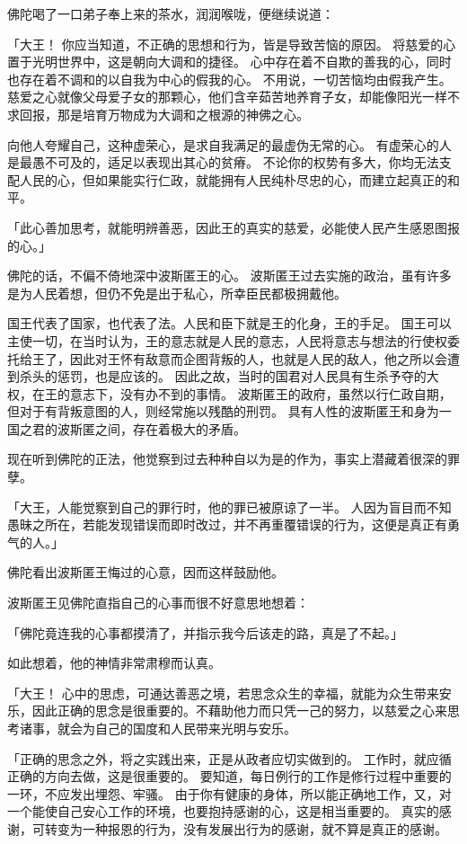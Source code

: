 \documentclass[twoside,openany]{book}
\begin{document}
佛陀喝了一口弟子奉上来的茶水，润润喉咙，便继续说道：

「大王！
你应当知道，不正确的思想和行为，皆是导致苦恼的原因。
将慈爱的心置于光明世界中，这是朝向大调和的捷径。
心中存在着不自欺的善我的心，同时也存在着不调和的以自我为中心的假我的心。
不用说，一切苦恼均由假我产生。
慈爱之心就像父母爱子女的那颗心，他们含辛茹苦地养育子女，却能像阳光一样不求回报，那是培育万物成为大调和之根源的神佛之心。

向他人夸耀自己，这种虚荣心，是求自我满足的最虚伪无常的心。
有虚荣心的人是最愚不可及的，适足以表现出其心的贫瘠。
不论你的权势有多大，你均无法支配人民的心，但如果能实行仁政，就能拥有人民纯朴尽忠的心，而建立起真正的和平。

「此心善加思考，就能明辨善恶，因此王的真实的慈爱，必能使人民产生感恩图报的心。」

佛陀的话，不偏不倚地深中波斯匿王的心。
波斯匿王过去实施的政治，虽有许多是为人民着想，但仍不免是出于私心，所幸臣民都极拥戴他。

国王代表了国家，也代表了法。人民和臣下就是王的化身，王的手足。
国王可以主使一切，在当时认为，王的意志就是人民的意志，人民将意志与想法的行使权委托给王了，因此对王怀有敌意而企图背叛的人，也就是人民的敌人，他之所以会遭到杀头的惩罚，也是应该的。
因此之故，当时的国君对人民具有生杀予夺的大权，在王的意志下，没有办不到的事情。
波斯匿王的政府，虽然以行仁政自期，但对于有背叛意图的人，则经常施以残酷的刑罚。
具有人性的波斯匿王和身为一国之君的波斯匿之间，存在着极大的矛盾。

现在听到佛陀的正法，他觉察到过去种种自以为是的作为，事实上潜藏着很深的罪孽。

「大王，人能觉察到自己的罪行时，他的罪已被原谅了一半。
人因为盲目而不知愚昧之所在，若能发现错误而即时改过，并不再重覆错误的行为，这便是真正有勇气的人。」

佛陀看出波斯匿王悔过的心意，因而这样鼓励他。

波斯匿王见佛陀直指自己的心事而很不好意思地想着：

「佛陀竟连我的心事都摸清了，并指示我今后该走的路，真是了不起。」

如此想着，他的神情非常肃穆而认真。

「大王！
心中的思虑，可通达善恶之境，若思念众生的幸福，就能为众生带来安乐，因此正确的思念是很重要的。不藉助他力而只凭一己的努力，以慈爱之心来思考诸事，就会为自己的国度和人民带来光明与安乐。

「正确的思念之外，将之实践出来，正是从政者应切实做到的。
工作时，就应循正确的方向去做，这是很重要的。
要知道，每日例行的工作是修行过程中重要的一环，不应发出埋怨、牢骚。
由于你有健康的身体，所以能正确地工作，又，对一个能使自己安心工作的环境，也要抱持感谢的心，这是相当重要的。
真实的感谢，可转变为一种报恩的行为，没有发展出行为的感谢，就不算是真正的感谢。
\end{document}
